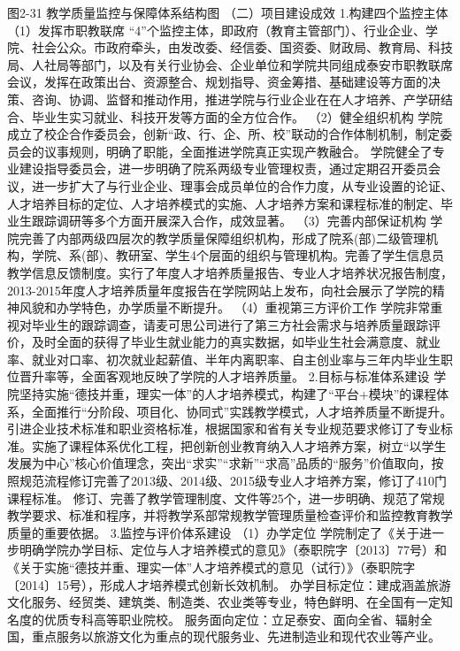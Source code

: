 图2-31 教学质量监控与保障体系结构图
（二）项目建设成效
1.构建四个监控主体
（1）发挥市职教联席
“4”个监控主体，即政府（教育主管部门）、行业企业、学院、社会公众。市政府牵头，由发改委、经信委、国资委、财政局、教育局、科技局、人社局等部门，以及有关行业协会、企业单位和学院共同组成泰安市职教联席会议，发挥在政策出台、资源整合、规划指导、资金筹措、基础建设等方面的决策、咨询、协调、监督和推动作用，推进学院与行业企业在在人才培养、产学研结合、毕业生实习就业、科技开发等方面的全方位合作。
（2）健全组织机构
学院成立了校企合作委员会，创新“政、行、企、所、校”联动的合作体制机制，制定委员会的议事规则，明确了职能，全面推进学院真正实现产教融合。
学院健全了专业建设指导委员会，进一步明确了院系两级专业管理权责，通过定期召开委员会议，进一步扩大了与行业企业、理事会成员单位的合作力度，从专业设置的论证、人才培养目标的定位、人才培养模式的实施、人才培养方案和课程标准的制定、毕业生跟踪调研等多个方面开展深入合作，成效显著。 
（3）完善内部保证机构
学院完善了内部两级四层次的教学质量保障组织机构，形成了院系(部)二级管理机构，学院、系(部)、教研室、学生4个层面的组织与管理机构。完善了学生信息员教学信息反馈制度。实行了年度人才培养质量报告、专业人才培养状况报告制度，2013-2015年度人才培养质量年度报告在学院网站上发布，向社会展示了学院的精神风貌和办学特色，办学质量不断提升。
（4）重视第三方评价工作
学院非常重视对毕业生的跟踪调查，请麦可思公司进行了第三方社会需求与培养质量跟踪评价，及时全面的获得了毕业生就业能力的真实数据，如毕业生社会满意度、就业率、就业对口率、初次就业起薪值、半年内离职率、自主创业率与三年内毕业生职位晋升率等，全面客观地反映了学院的人才培养质量。
2.目标与标准体系建设
学院坚持实施“德技并重，理实一体”的人才培养模式，构建了“平台+模块”的课程体系，全面推行“分阶段、项目化、协同式”实践教学模式，人才培养质量不断提升。引进企业技术标准和职业资格标准，根据国家和省有关专业规范要求修订了专业标准。实施了课程体系优化工程，把创新创业教育纳入人才培养方案，树立“以学生发展为中心”核心价值理念，突出“求实”“求新”“求高”品质的“服务”价值取向，按照规范流程修订完善了2013级、2014级、2015级专业人才培养方案，修订了410门课程标准。
修订、完善了教学管理制度、文件等25个，进一步明确、规范了常规教学要求、标准和程序，并将教学系部常规教学管理质量检查评价和监控教育教学质量的重要依据。
3.监控与评价体系建设
（1）办学定位
学院制定了《关于进一步明确学院办学目标、定位与人才培养模式的意见》（泰职院字〔2013〕77号）和《关于实施“德技并重、理实一体”人才培养模式的意见（试行）》（泰职院字〔2014〕15号），形成人才培养模式创新长效机制。
办学目标定位：建成涵盖旅游文化服务、经贸类、建筑类、制造类、农业类等专业，特色鲜明、在全国有一定知名度的优质专科高等职业院校。
服务面向定位：立足泰安、面向全省、辐射全国，重点服务以旅游文化为重点的现代服务业、先进制造业和现代农业等产业。
